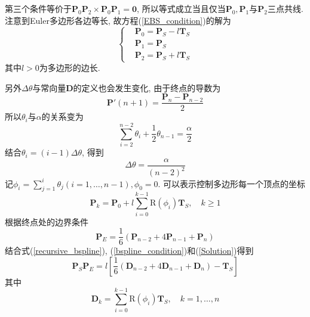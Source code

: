 \documentclass[utf8]{ctexart} %
\numberwithin{figure}{section}
\numberwithin{equation}{section}
\begin{document}
	 第三个条件等价于$\boldsymbol{P}_0\boldsymbol{P}_2\times\boldsymbol{P}_0\boldsymbol{P}_1=\boldsymbol{0}$, 所以等式成立当且仅当$\boldsymbol{P}_0,\boldsymbol{P}_1$与$\boldsymbol{P}_2$三点共线. 注意到Euler多边形各边等长,  故方程(\ref{EBS_condition})的解为
	 \begin{equation}\label{Solution}
	 \left\{
	 \begin{aligned}
	 &\boldsymbol{P}_0 = \boldsymbol{P}_S-l\boldsymbol{T}_S\\
	 &\boldsymbol{P}_1 = \boldsymbol{P}_S\\
	 &\boldsymbol{P}_2 = \boldsymbol{P}_S+l\boldsymbol{T}_S
	 \end{aligned}
	 \right.
	 \end{equation}
	 其中$l>0$为多边形的边长.\par 
	 另外$\Delta\theta$与常向量$\boldsymbol{D}$的定义也会发生变化, 由于终点的导数为
	 \begin{equation}
	 \boldsymbol{P}'(n+1) = \frac{\boldsymbol{P}_n-\boldsymbol{P}_{n-2}}2
	 \end{equation}
	 所以$\theta_i$与$\alpha$的关系变为
	 \begin{equation}
	 \sum_{i=2}^{n-2}\theta_i+\frac12\theta_{n-1}=\frac{\alpha}2
	 \end{equation}
	 结合$\theta_i=(i-1)\Delta\theta$, 得到
	 \begin{equation}
	 \Delta\theta = \frac{\alpha}{(n-2)^2}
	 \end{equation}
	 记$\phi_i=\sum_{j=1}^i\theta_j (i = 1,\dots,n-1), \phi_0 = 0$. 可以表示控制多边形每一个顶点的坐标
	 \begin{equation}\label{recursive_bspline}
	 \boldsymbol{P}_k = \boldsymbol{P}_0+l\sum_{i=0}^{k-1}\text{R}(\phi_i)\boldsymbol{T}_S,\quad k\geq1
	 \end{equation}
	 根据终点处的边界条件
	 \begin{equation}\label{bspline_condition}
	 \boldsymbol{P}_E = \frac{1}6(\boldsymbol{P}_{n-2}+4\boldsymbol{P}_{n-1}+\boldsymbol{P}_n)
	 \end{equation}
	结合式(\ref{recursive_bspline}), (\ref{bspline_condition})和(\ref{Solution})得到
	\begin{equation}
	\boldsymbol{P}_S\boldsymbol{P}_E=l[\frac16(\boldsymbol{D}_{n-2}+4\boldsymbol{D}_{n-1}+\boldsymbol{D}_n)-\boldsymbol{T}_S]
	\end{equation}
	其中\begin{equation}
	\boldsymbol{D}_k = \sum_{i=0}^{k-1}\text{R}(\phi_i)\boldsymbol{T}_S,\quad k=1,\dots,n
	\end{equation}
\end{document}
